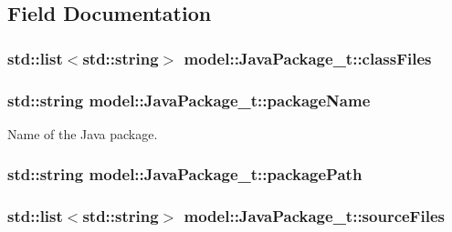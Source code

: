 \subsection{Field Documentation}
\subsubsection[{\texorpdfstring{class\+Files}{classFiles}}]{\setlength{\rightskip}{0pt plus 5cm}std\+::list$<$std\+::string$>$ model\+::\+Java\+Package\+\_\+t\+::class\+Files}\hypertarget{structmodel_1_1_java_package__t_a6371759a7c3f6c8dd5eb95f8f24aea6d}{}\label{structmodel_1_1_java_package__t_a6371759a7c3f6c8dd5eb95f8f24aea6d}
\subsubsection[{\texorpdfstring{package\+Name}{packageName}}]{\setlength{\rightskip}{0pt plus 5cm}std\+::string model\+::\+Java\+Package\+\_\+t\+::package\+Name}\hypertarget{structmodel_1_1_java_package__t_a8a82c911cd0654437bf2cf46b4f84115}{}\label{structmodel_1_1_java_package__t_a8a82c911cd0654437bf2cf46b4f84115}


Name of the Java package. 

\subsubsection[{\texorpdfstring{package\+Path}{packagePath}}]{\setlength{\rightskip}{0pt plus 5cm}std\+::string model\+::\+Java\+Package\+\_\+t\+::package\+Path}\hypertarget{structmodel_1_1_java_package__t_a3902d187ff74e81fdd6ebb819c3d40ea}{}\label{structmodel_1_1_java_package__t_a3902d187ff74e81fdd6ebb819c3d40ea}
\subsubsection[{\texorpdfstring{source\+Files}{sourceFiles}}]{\setlength{\rightskip}{0pt plus 5cm}std\+::list$<$std\+::string$>$ model\+::\+Java\+Package\+\_\+t\+::source\+Files}\hypertarget{structmodel_1_1_java_package__t_ac9f8e147597db85208ff1a12b270c476}{}\label{structmodel_1_1_java_package__t_ac9f8e147597db85208ff1a12b270c476}


